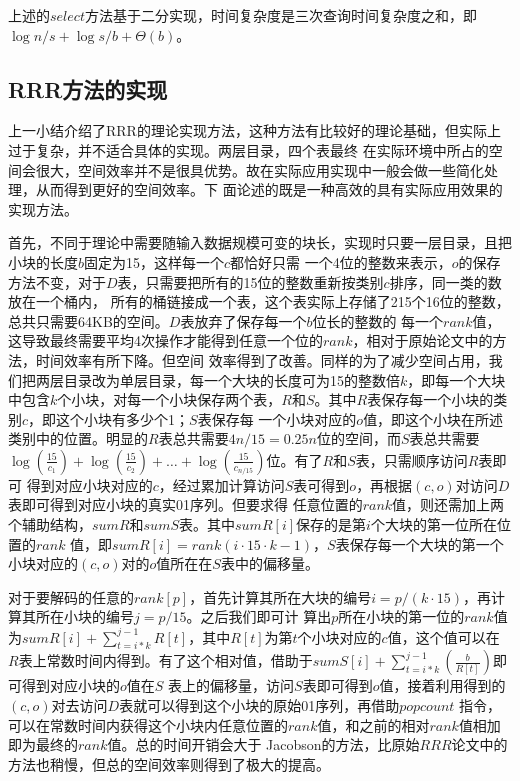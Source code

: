 上述的$select$方法基于二分实现，时间复杂度是三次查询时间复杂度之和，即$\log{n/s}+\log{s/b}+\Theta(b)$。

\subsection{RRR方法的实现}

上一小结介绍了RRR的理论实现方法，这种方法有比较好的理论基础，但实际上过于复杂，并不适合具体的实现。两层目录，四个表最终
在实际环境中所占的空间会很大，空间效率并不是很具优势。故在实际应用实现中一般会做一些简化处理，从而得到更好的空间效率。下
面论述的既是一种高效的具有实际应用效果的实现方法。

首先，不同于理论中需要随输入数据规模可变的块长，实现时只要一层目录，且把小块的长度$b$固定为15，这样每一个$c$都恰好只需
一个4位的整数来表示，$o$的保存方法不变，对于$D$表，只需要把所有的15位的整数重新按类别$c$排序，同一类的数放在一个桶内，
所有的桶链接成一个表，这个表实际上存储了215个16位的整数，总共只需要64KB的空间。$D$表放弃了保存每一个$b$位长的整数的
每一个$rank$值，这导致最终需要平均4次操作才能得到任意一个位的$rank$，相对于原始论文中的方法，时间效率有所下降。但空间
效率得到了改善。同样的为了减少空间占用，我们把两层目录改为单层目录，每一个大块的长度可为15的整数倍$k$，即每一个大块
中包含$k$个小块，对每一个小块保存两个表，$R$和$S$。其中$R$表保存每一个小块的类别$c$，即这个小块有多少个1；$S$表保存每
一个小块对应的$o$值，即这个小块在所述类别中的位置。明显的$R$表总共需要$4n/15 = 0.25n$位的空间，而$S$表总共需要
$\log(\frac{15}{c_1})+\log(\frac{15}{c_2})+\ldots+\log(\frac{15}{c_{n/15}})$位。有了$R$和$S$表，只需顺序访问$R$表即可
得到对应小块对应的$c$，经过累加计算访问$S$表可得到$o$，再根据$(c, o)$对访问$D$表即可得到对应小块的真实01序列。但要求得
任意位置的$rank$值，则还需加上两个辅助结构，$sumR$和$sumS$表。其中$sumR[i]$保存的是第$i$个大块的第一位所在位置的$rank$
值，即$sumR[i] = rank(i⋅15⋅k − 1)$，$S$表保存每一个大块的第一个小块对应的$(c, o)$对的$o$值所在在$S$表中的偏移量。


对于要解码的任意的$rank[p]$，首先计算其所在大块的编号$i = p/(k⋅15)$，再计算其所在小块的编号$j = p/15$。之后我们即可计
算出$p$所在小块的第一位的$rank$值为$sumR[i]+\sum_{t=i*k}^{j-1}R[t]$，其中$R[t]$为第$t$个小块对应的$c$值，这个值可以在
$R$表上常数时间内得到。有了这个相对值，借助于$sumS[i]+ \sum_{t=i*k}^{j-1}(\frac{b}{R[t]})$即可得到对应小块的$o$值在$S$
表上的偏移量，访问$S$表即可得到$o$值，接着利用得到的$(c, o)$对去访问$D$表就可以得到这个小块的原始01序列，再借助$popcount$
指令，可以在常数时间内获得这个小块内任意位置的$rank$值，和之前的相对$rank$值相加即为最终的$rank$值。总的时间开销会大于
Jacobson的方法，比原始$RRR$论文中的方法也稍慢，但总的空间效率则得到了极大的提高。

